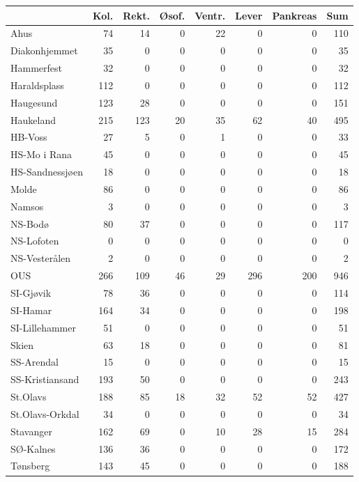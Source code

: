 \documentclass[norsk,a4paper]{article}\usepackage[]{graphicx}\usepackage[]{color}
\begin{document}
\begin{table}[ht]
\centering
\begin{tabular}{lrrrrrrr}
  \hline
 & Kol. & Rekt. & Øsof. & Ventr. & Lever & Pankreas & Sum \\ 
  \hline
Ahus & 74 & 14 & 0 & 22 & 0 & 0 & 110 \\ 
  Diakonhjemmet & 35 & 0 & 0 & 0 & 0 & 0 & 35 \\ 
  Hammerfest & 32 & 0 & 0 & 0 & 0 & 0 & 32 \\ 
  Haraldsplass & 112 & 0 & 0 & 0 & 0 & 0 & 112 \\ 
  Haugesund & 123 & 28 & 0 & 0 & 0 & 0 & 151 \\ 
  Haukeland & 215 & 123 & 20 & 35 & 62 & 40 & 495 \\ 
  HB-Voss  & 27 & 5 & 0 & 1 & 0 & 0 & 33 \\ 
  HS-Mo i Rana & 45 & 0 & 0 & 0 & 0 & 0 & 45 \\ 
  HS-Sandnessjøen & 18 & 0 & 0 & 0 & 0 & 0 & 18 \\ 
  Molde & 86 & 0 & 0 & 0 & 0 & 0 & 86 \\ 
  Namsos & 3 & 0 & 0 & 0 & 0 & 0 & 3 \\ 
  NS-Bodø & 80 & 37 & 0 & 0 & 0 & 0 & 117 \\ 
  NS-Lofoten & 0 & 0 & 0 & 0 & 0 & 0 & 0 \\ 
  NS-Vesterålen & 2 & 0 & 0 & 0 & 0 & 0 & 2 \\ 
  OUS & 266 & 109 & 46 & 29 & 296 & 200 & 946 \\ 
  SI-Gjøvik & 78 & 36 & 0 & 0 & 0 & 0 & 114 \\ 
  SI-Hamar & 164 & 34 & 0 & 0 & 0 & 0 & 198 \\ 
  SI-Lillehammer & 51 & 0 & 0 & 0 & 0 & 0 & 51 \\ 
  Skien & 63 & 18 & 0 & 0 & 0 & 0 & 81 \\ 
  SS-Arendal & 15 & 0 & 0 & 0 & 0 & 0 & 15 \\ 
  SS-Kristiansand & 193 & 50 & 0 & 0 & 0 & 0 & 243 \\ 
  St.Olavs & 188 & 85 & 18 & 32 & 52 & 52 & 427 \\ 
  St.Olavs-Orkdal & 34 & 0 & 0 & 0 & 0 & 0 & 34 \\ 
  Stavanger & 162 & 69 & 0 & 10 & 28 & 15 & 284 \\ 
  SØ-Kalnes & 136 & 36 & 0 & 0 & 0 & 0 & 172 \\ 
  Tønsberg & 143 & 45 & 0 & 0 & 0 & 0 & 188 \\ 

\end{tabular}
\end{table}
\end{document}
